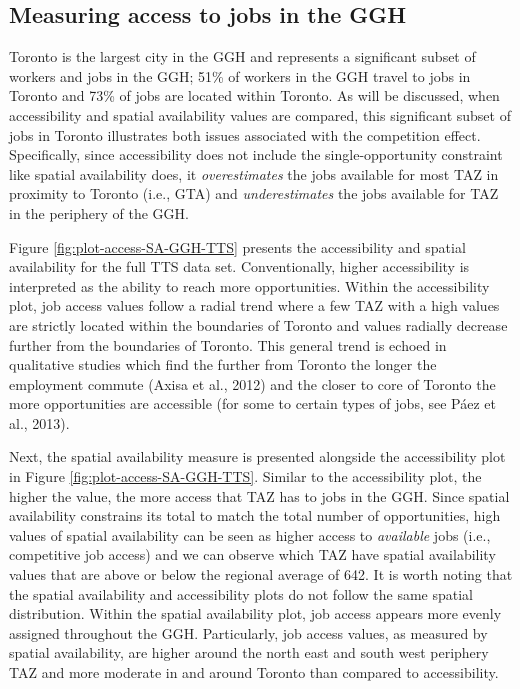 \documentclass[]{elsarticle} %
\begin{document}
\hypertarget{measuring-access-to-jobs-in-the-ggh}{%
\subsection{Measuring access to jobs in the
GGH}\label{measuring-access-to-jobs-in-the-ggh}}

Toronto is the largest city in the GGH and represents a significant
subset of workers and jobs in the GGH; 51\% of workers in the GGH travel
to jobs in Toronto and 73\% of jobs are located within Toronto. As will
be discussed, when accessibility and spatial availability values are
compared, this significant subset of jobs in Toronto illustrates both
issues associated with the competition effect. Specifically, since
accessibility does not include the single-opportunity constraint like
spatial availability does, it \emph{overestimates} the jobs available
for most TAZ in proximity to Toronto (i.e., GTA) and
\emph{underestimates} the jobs available for TAZ in the periphery of the
GGH.

Figure \ref{fig:plot-access-SA-GGH-TTS} presents the accessibility and
spatial availability for the full TTS data set. Conventionally, higher
accessibility is interpreted as the ability to reach more opportunities.
Within the accessibility plot, job access values follow a radial trend
where a few TAZ with a high values are strictly located within the
boundaries of Toronto and values radially decrease further from the
boundaries of Toronto. This general trend is echoed in qualitative
studies which find the further from Toronto the longer the employment
commute (Axisa et al., 2012) and the closer to core of Toronto the more
opportunities are accessible (for some to certain types of jobs, see
Páez et al., 2013).

Next, the spatial availability measure is presented alongside the
accessibility plot in Figure \ref{fig:plot-access-SA-GGH-TTS}. Similar
to the accessibility plot, the higher the value, the more access that
TAZ has to jobs in the GGH. Since spatial availability constrains its
total to match the total number of opportunities, high values of spatial
availability can be seen as higher access to \emph{available} jobs
(i.e., competitive job access) and we can observe which TAZ have spatial
availability values that are above or below the regional average of 642.
It is worth noting that the spatial availability and accessibility plots
do not follow the same spatial distribution. Within the spatial
availability plot, job access appears more evenly assigned throughout
the GGH. Particularly, job access values, as measured by spatial
availability, are higher around the north east and south west periphery
TAZ and more moderate in and around Toronto than compared to
accessibility.
\end{document}
